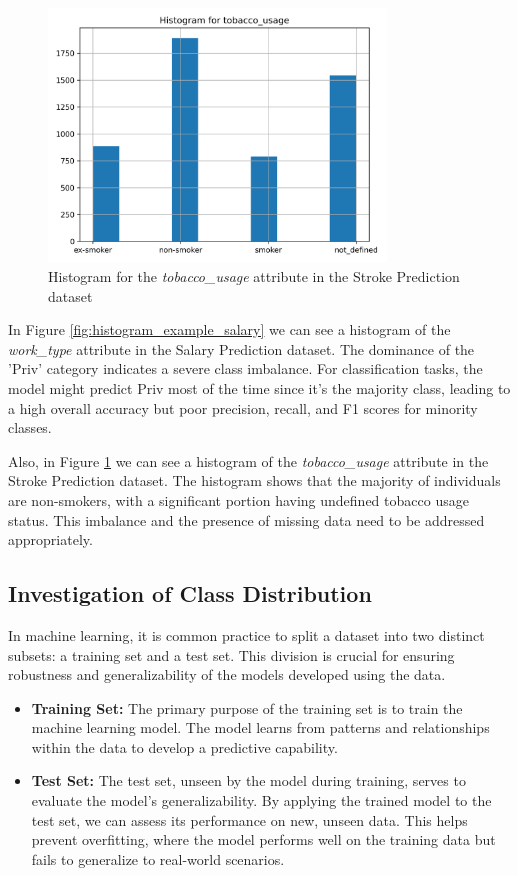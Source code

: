 \documentclass[runningheads]{paper}
\begin{document}
\begin{figure}[H]
    \centering
    \includegraphics[width=0.8\textwidth]{../plots/histogram_tobacco_usage_AVC_full.png}
    \caption{Histogram for the \textit{tobacco\_usage} attribute in the Stroke Prediction dataset}
    \label{fig:histogram_example_stroke}
\end{figure}

In Figure \ref{fig:histogram_example_salary} we can see a histogram of the
\textit{work\_type} attribute in the Salary Prediction dataset. The dominance of
the 'Priv' category indicates a severe class imbalance. For classification tasks,
the model might predict Priv most of the time since it's the majority class, 
leading to a high overall accuracy but poor precision, recall, and F1 scores 
for minority classes.

Also, in Figure \ref{fig:histogram_example_stroke} we can see a histogram of the
\textit{tobacco\_usage} attribute in the Stroke Prediction dataset. The histogram 
shows that the majority of individuals are non-smokers, with a significant portion 
having undefined tobacco usage status. This imbalance and the presence of missing 
data need to be addressed appropriately.

\subsection{Investigation of Class Distribution}
In machine learning, it is common practice to split a dataset into two distinct
subsets: a training set and a test set. This division is crucial for ensuring 
 robustness and generalizability of the models developed using the data.

\begin{itemize}
    \item \textbf{Training Set:} The primary purpose of the training set is to 
    train the machine 
    learning model. The model learns from patterns and relationships within the data 
    to develop a predictive capability.
    \item \textbf{Test Set:} The test set, unseen by the model during training, 
    serves to evaluate the model's generalizability. By applying the trained 
    model to the test set, we can assess its performance on new, unseen data. 
    This helps prevent overfitting, where the model performs well on the 
    training data but fails to generalize to real-world scenarios.
\end{itemize}
\end{document}
